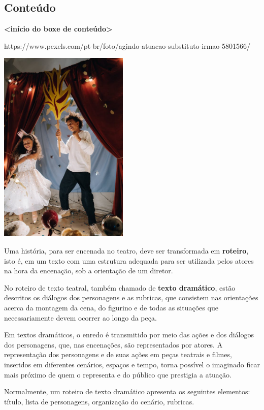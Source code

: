 \subsection{Conteúdo}\label{conteuxfado-1}

\textbf{\textless{}início do boxe de conteúdo\textgreater{}}

https://www.pexels.com/pt-br/foto/agindo-atuacao-substituto-irmao-5801566/

\includegraphics[width=2.43750in,height=3.65625in]{media/image1.jpeg}

Uma história, para ser encenada no teatro, deve ser transformada em
\textbf{roteiro}, isto é, em um texto com uma estrutura adequada para
ser utilizada pelos atores na hora da encenação, sob a orientação de um
diretor.

No roteiro de texto teatral, também chamado de \textbf{texto dramático},
estão descritos os diálogos dos personagens e as rubricas, que consistem
nas orientações acerca da montagem da cena, do figurino e de todas as
situações que necessariamente devem ocorrer ao longo da peça.

Em textos dramáticos, o enredo é transmitido por meio das ações e dos
diálogos dos personagens, que, nas encenações, são representados por
atores. A representação dos personagens e de suas ações em peças
teatrais e filmes, inseridos em diferentes cenários, espaços e tempo,
torna possível o imaginado ficar mais próximo de quem o representa e do
público que prestigia a atuação.

Normalmente, um roteiro de texto dramático apresenta os seguintes
elementos: título, lista de personagens, organização do cenário,
rubricas.

